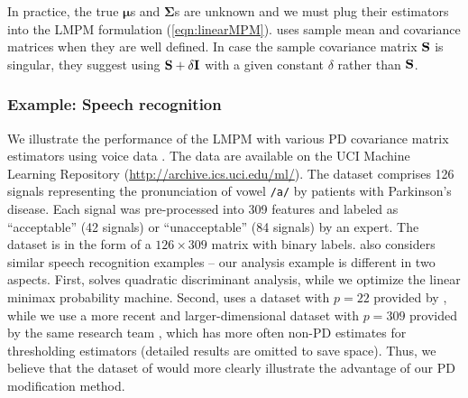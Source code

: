 \documentclass[times,sort&compress,3p]{elsarticle}
\begin{document}
In practice, the true ${\boldsymbol \mu}$s and ${\boldsymbol \Sigma}$s are unknown and we must plug their
estimators into the LMPM formulation (\ref{eqn:linearMPM}).
\citet{Lanckriet2002} uses sample mean and covariance matrices when they are well defined. In case
the sample covariance matrix ${\bf S}$ is singular, they suggest using ${\bf S} + \delta {\bf I}$ with a given constant
$\delta$ rather than ${\bf S}$.


\subsubsection{Example: Speech recognition}\label{subsubSection:speech}

We illustrate the performance of the LMPM with various PD covariance matrix estimators using
voice data \citep{Tsanas2014}. The data are available on the UCI Machine Learning
Repository (\url{http://archive.ics.uci.edu/ml/}).
The dataset comprises 126 signals representing the pronunciation of vowel \texttt{/a/} by patients with Parkinson's disease. Each signal was pre-processed into 309 features and labeled as ``acceptable'' (42 signals) or ``unacceptable'' (84 signals) by an expert. The dataset is in the form of a $126 \times 309$ matrix with binary labels.
\color{magenta}
\citet{Rothman2012} also considers similar speech recognition examples -- our analysis example is different in two aspects. First, \citet{Rothman2012} solves quadratic discriminant analysis, while we optimize the linear minimax probability machine. Second, 
\citet{Rothman2012} uses a dataset with $p=22$ provided by \citet{Little2009}, while we use a more recent and larger-dimensional dataset with $p=309$ 
provided by the same research team \citep{Tsanas2014}, which has more often non-PD estimates for thresholding estimators 
(detailed results are omitted to save space).
Thus, we believe that the dataset of \citet{Tsanas2014} would more clearly illustrate the advantage of our PD modification method. 
\end{document}
